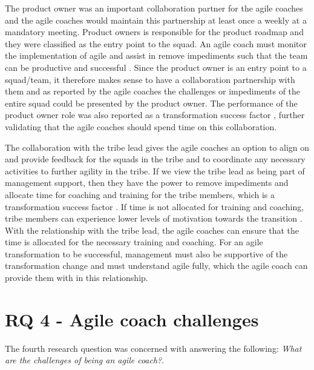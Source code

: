 \documentclass[11pt,a4paper]{report}
\begin{document}
The product owner was an important collaboration partner for the agile coaches and the agile coaches would maintain this partnership at least once a weekly at a mandatory meeting. Product owners is responsible for the product roadmap and they were classified as the entry point to the squad. An agile coach must monitor the implementation of agile and assist in remove impediments such that the team can be productive and  successful \cite{stray2020agile}. Since the product owner is an entry point to a squad/team, it therefore makes sense to have a collaboration partnership with them and as reported by the agile coaches the challenges or impediments of the entire squad could be presented by the product owner. The performance of the product owner role was also reported as a transformation success factor \cite{dikert2016challenges}, further validating that the agile coaches should spend time on this collaboration.

The collaboration with the tribe lead gives the agile coaches an option to align on and provide feedback for the squads in the tribe and to coordinate any necessary activities to further agility in the tribe. If we view the tribe lead as being part of management support, then they have the power to remove impediments and allocate time for coaching and training for the tribe members, which is a transformation success factor \cite{dikert2016challenges}. If time is not allocated for training and coaching, tribe members can experience lower levels of motivation towards the transition \cite{dikert2016challenges}. With the relationship with the tribe lead, the agile coaches can ensure that the time is allocated for the necessary training and coaching. For an agile transformation to be successful, management must also be supportive of the transformation change \cite{dikert2016challenges} and must understand agile fully, which the agile coach can provide them with in this relationship.

\section{RQ 4 - Agile coach challenges}
The fourth research question was concerned with answering the following: \emph{What are the challenges of being an agile coach?}.
\end{document}
